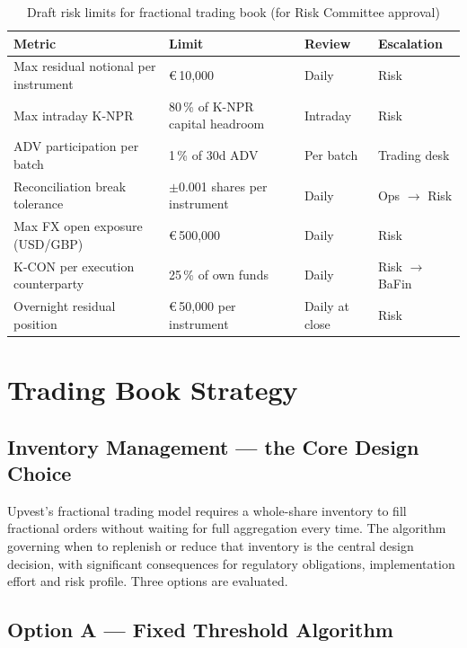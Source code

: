 \documentclass[12pt,a4paper]{report}
\newcommand{\eur}{\euro\,}
\begin{document}
\begin{table}[H]
\caption{Draft risk limits for fractional trading book (for Risk Committee approval)}
\label{tab:limits}
\small
\begin{tabularx}{\textwidth}{@{}L{4.5cm}L{3cm}R{2cm}L{3.5cm}@{}}
\toprule
\textbf{Metric} & \textbf{Limit} & \textbf{Review} & \textbf{Escalation} \\
\midrule
Max residual notional per instrument & \eur{}10{,}000 & Daily & Risk \\
Max intraday K-NPR & 80\,\% of K-NPR capital headroom & Intraday & Risk \\
ADV participation per batch & 1\,\% of 30d ADV & Per batch & Trading desk \\
Reconciliation break tolerance & $\pm$0.001 shares per instrument & Daily & Ops $\to$ Risk \\
Max FX open exposure (USD/GBP) & \eur{}500{,}000 & Daily & Risk \\
K-CON per execution counterparty & 25\,\% of own funds & Daily & Risk $\to$ BaFin \\
Overnight residual position & \eur{}50{,}000 per instrument & Daily at close & Risk \\
\bottomrule
\end{tabularx}
\end{table}

\chapter{Trading Book Strategy}

\section{Inventory Management --- the Core Design Choice}

Upvest's fractional trading model requires a whole-share inventory to fill fractional
orders without waiting for full aggregation every time. The algorithm governing when to
replenish or reduce that inventory is the central design decision, with significant
consequences for regulatory obligations, implementation effort and risk profile.
Three options are evaluated.

\section{Option A --- Fixed Threshold Algorithm}
\end{document}
